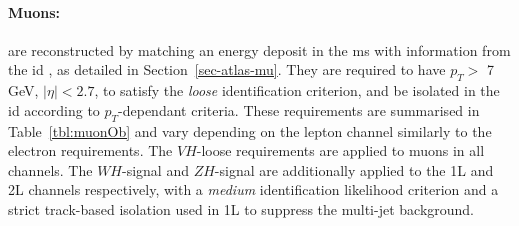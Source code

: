 \begin{table}[!htbp]
  \begin{center}
    \caption{Electron selection requirements. $ZH$-signal and $WH$-signal are abbreviated as $VH$-signal in the text.} 
    \label{tbl:elOb}
  \end{center}
\end{table}

\paragraph{Muons:} are reconstructed by matching an energy deposit in the \gls{ms} with information from the \gls{id} \cite{Aad:2746302}, as detailed in Section~\ref{sec-atlas-mu}. They are required to have $p_T >$ 7 GeV, $|\eta| < 2.7$, to satisfy the \textit{loose} identification criterion, and be isolated in the \gls{id} according to $p_T$-dependant criteria. These requirements are summarised in Table~\ref{tbl:muonOb} and vary depending on the lepton channel similarly to the electron requirements. The $VH$-loose requirements are applied to muons in all channels. The $WH$-signal and $ZH$-signal are additionally applied to the 1L and 2L channels respectively, with a \textit{medium} identification likelihood criterion and a strict track-based isolation used in 1L to suppress the multi-jet background.

